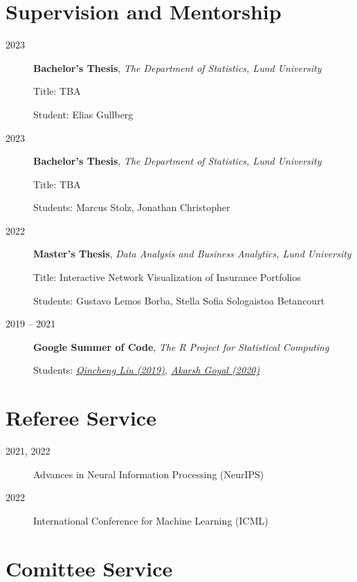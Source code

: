 \documentclass[english,a4paper]{article}
\renewcommand*{%
  \mkbibnamegiven
}[1]{\ifitemannotation{highlight}{\textbf{#1}}{#1}}
\renewcommand*{%
  \mkbibnamefamily
}[1]{\ifitemannotation{highlight}{\textbf{#1}}{#1}}
\begin{document}
\section{Supervision and Mentorship}

\begin{description}
  \item[2023] {
    \textbf{Bachelor's Thesis}, \emph{The Department of Statistics, Lund University}

    Title: TBA

    Student: Elias Gullberg
    }
  \item[2023] {
    \textbf{Bachelor's Thesis}, \emph{The Department of Statistics, Lund University}

    Title: TBA

    Students: Marcus Stolz, Jonathan Christopher
    }
  \item[2022] {
    \textbf{Master's Thesis}, \emph{Data Analysis and Business Analytics, Lund University}

    Title: Interactive Network Visualization of Insurance Portfolios

    Students: Gustavo Lemos Borba, Stella Sofia Sologaistoa Betancourt
    }
    \item[2019 -- 2021]{\textbf{Google Summer of Code}, \emph{The R Project for Statistical Computing}

                Students: \emph{\href{https://summerofcode.withgoogle.com/archive/2019/projects/4654960430546944}{Qincheng Liu (2019)}, \href{https://summerofcode.withgoogle.com/archive/2020/projects/5476086193848320}{Akarsh Goyal (2020)}}
          }
\end{description}

\section{Referee Service}

\begin{description}
  \item[2021, 2022]{Advances in Neural Information Processing (NeurIPS)}
  \item[2022]{International Conference for Machine Learning (ICML)}
\end{description}

\section{Comittee Service}
\end{document}
